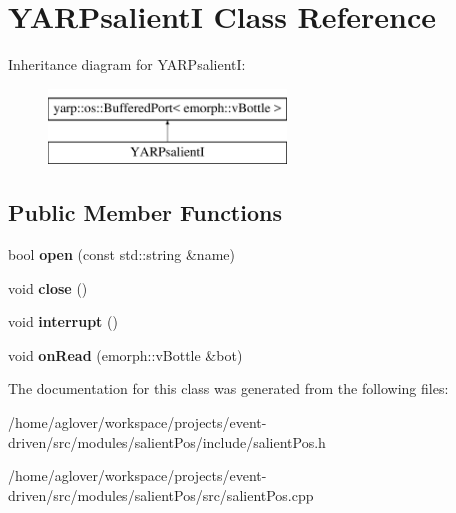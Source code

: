 \hypertarget{classYARPsalientI}{}\section{Y\+A\+R\+PsalientI Class Reference}
\label{classYARPsalientI}
Inheritance diagram for Y\+A\+R\+PsalientI\+:\begin{figure}[H]
\begin{center}
\leavevmode
\includegraphics[height=2.000000cm]{classYARPsalientI}
\end{center}
\end{figure}
\subsection*{Public Member Functions}
\begin{DoxyCompactItemize}
\item 
bool {\bfseries open} (const std\+::string \&name)\hypertarget{classYARPsalientI_a250043be66377743478e388938d74360}{}\label{classYARPsalientI_a250043be66377743478e388938d74360}

\item 
void {\bfseries close} ()\hypertarget{classYARPsalientI_a253d99f4b7595c0f314c6e85bd55073f}{}\label{classYARPsalientI_a253d99f4b7595c0f314c6e85bd55073f}

\item 
void {\bfseries interrupt} ()\hypertarget{classYARPsalientI_a17ab82fc3d6e2c463d62a5dcc17d8ea3}{}\label{classYARPsalientI_a17ab82fc3d6e2c463d62a5dcc17d8ea3}

\item 
void {\bfseries on\+Read} (emorph\+::v\+Bottle \&bot)\hypertarget{classYARPsalientI_ab6bf391f4c8ce629536eca1302866989}{}\label{classYARPsalientI_ab6bf391f4c8ce629536eca1302866989}

\end{DoxyCompactItemize}


The documentation for this class was generated from the following files\+:\begin{DoxyCompactItemize}
\item 
/home/aglover/workspace/projects/event-\/driven/src/modules/salient\+Pos/include/salient\+Pos.\+h\item 
/home/aglover/workspace/projects/event-\/driven/src/modules/salient\+Pos/src/salient\+Pos.\+cpp\end{DoxyCompactItemize}
